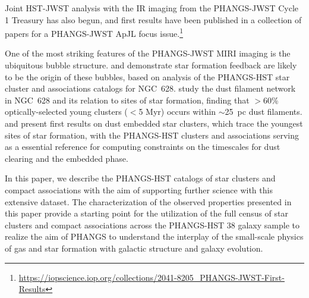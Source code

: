 \documentclass[linenumbers]{aastex63}
\begin{document}
Joint HST-JWST analysis with the IR imaging from the PHANGS-JWST Cycle 1 Treasury has also begun, and first results have been published in a collection of papers for a PHANGS-JWST ApJL focus issue.\footnote{\url{https://iopscience.iop.org/collections/2041-8205_PHANGS-JWST-First-Results}}  

One of the most striking features of the PHANGS-JWST MIRI imaging is the ubiquitous bubble structure\citep{lee_phangs-jwst_2023}. \citet{watkins_phangs-jwst_2023} and \citet{barnes_phangs-jwst_2023} demonstrate star formation feedback are likely to be the origin of these bubbles, based on analysis of the PHANGS-HST star cluster and associations catalogs for NGC~628.  \citet{thilker_phangs-jwst_2023} study the dust filament network in NGC~628 and its relation to sites of star formation, finding that $>$60\% optically-selected young clusters ($<$5 Myr) occurs within $\sim$25~pc dust filaments. \citet{rodriguez_phangs-jwst_2023} and \citet{whitmore_phangs-jwst_2023} present first results on dust embedded star clusters, which trace the youngest sites of star formation, with the PHANGS-HST clusters and associations serving as a essential reference for computing constraints on the timescales for dust clearing and the embedded phase.


In this paper, we describe the PHANGS-HST catalogs of star clusters and compact associations with the aim of supporting further science with this extensive dataset.  The characterization of the observed properties presented in this paper provide a starting point for the utilization of the full census of star clusters and compact associations across the PHANGS-HST 38 galaxy sample to realize the aim of PHANGS to understand the interplay of the small-scale physics of gas and star formation with galactic structure and galaxy evolution.
\end{document}
